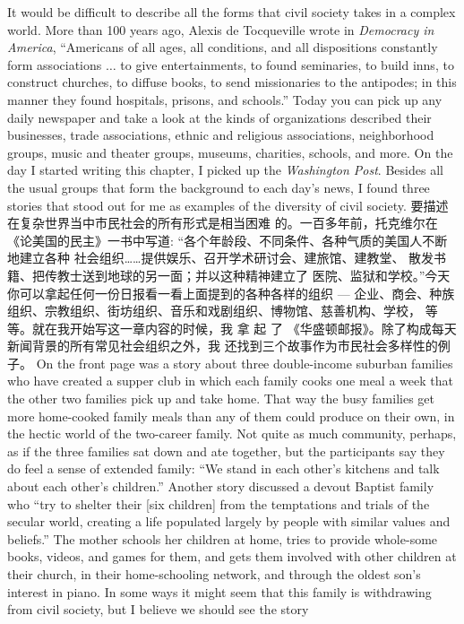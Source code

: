 \begin{paracol}{2}
It would be difficult to describe all the forms that civil society
takes in a complex world. More than 100 years ago, Alexis de
Tocqueville wrote in \textit{Democracy in America}, ``Americans of all
ages, all conditions, and all dispositions constantly form associations $\ldots$ to give entertainments, to found seminaries, to build
inns, to construct churches, to diffuse books, to send missionaries to the antipodes; in this manner they found hospitals, prisons, and schools.'' Today you can pick up any daily newspaper
and take a look at the kinds of organizations described their businesses, trade associations, ethnic and religious associations,
neighborhood groups, music and theater groups, museums,
charities, schools, and more. On the day I started writing this
chapter, I picked up the \textit{Washington Post}. Besides all the usual
groups that form the background to each day's news, I found
three stories that stood out for me as examples of the diversity
of civil society.
\switchcolumn
要描述在复杂世界当中市民社会的所有形式是相当困难
的。一百多年前，托克维尔在《论美国的民主》一书中写道:
“各个年龄段、不同条件、各种气质的美国人不断地建立各种
社会组织……提供娱乐、召开学术研讨会、建旅馆、建教堂、
散发书籍、把传教士送到地球的另一面；并以这种精神建立了
医院、监狱和学校。”今天你可以拿起任何一份日报看一看上面提到的各种各样的组织 --- 企业、商会、种族组织、宗教组织、街坊组织、音乐和戏剧组织、博物馆、慈善机构、学校，
等等。就在我开始写这一章内容的时候，我 拿 起 了 《华盛顿邮报》。除了构成每天新闻背景的所有常见社会组织之外，我
还找到三个故事作为市民社会多样性的例子。
\switchcolumn*
On the front page was a story about three double-income
suburban families who have created a supper club in which each
family cooks one meal a week that the other two families pick
up and take home. That way the busy families get more home-cooked family meals than any of them could produce on their
own, in the hectic world of the two-career family. Not quite as
much community, perhaps, as if the three families sat down and
ate together, but the participants say they do feel a sense of extended family: ``We stand in each other's kitchens and talk
about each other's children.'' Another story discussed a devout
Baptist family who ``try to shelter their [six children] from the
temptations and trials of the secular world, creating a life populated largely by people with similar values and beliefs.'' The
mother schools her children at home, tries to provide whole-some books, videos, and games for them, and gets them involved with other children at their church, in their
home-schooling network, and through the oldest son's interest in piano. In some ways it might seem that this family is withdrawing from civil society, but I believe we should see the story

\end{paracol}

